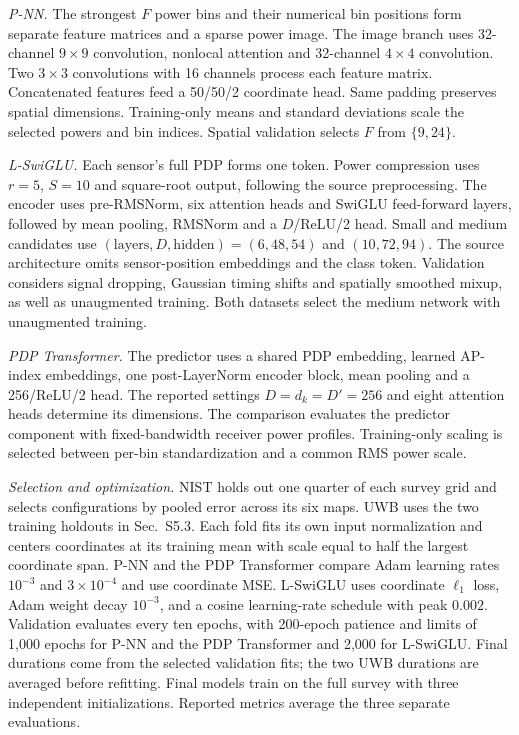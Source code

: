 \documentclass[10pt]{article}
\begin{document}
\emph{P-NN.} The strongest $F$ power bins and their numerical bin positions form separate feature matrices and a sparse power image. The image branch uses 32-channel $9\times9$ convolution, nonlocal attention and 32-channel $4\times4$ convolution. Two $3\times3$ convolutions with 16 channels process each feature matrix. Concatenated features feed a 50/50/2 coordinate head. Same padding preserves spatial dimensions. Training-only means and standard deviations scale the selected powers and bin indices. Spatial validation selects $F$ from $\{9,24\}$.

\emph{L-SwiGLU.} Each sensor's full PDP forms one token. Power compression uses $r=5$, $S=10$ and square-root output, following the source preprocessing. The encoder uses pre-RMSNorm, six attention heads and SwiGLU feed-forward layers, followed by mean pooling, RMSNorm and a $D$/ReLU/2 head. Small and medium candidates use $(\mathrm{layers},D,\mathrm{hidden})=(6,48,54)$ and $(10,72,94)$. The source architecture omits sensor-position embeddings and the class token. Validation considers signal dropping, Gaussian timing shifts and spatially smoothed mixup, as well as unaugmented training. Both datasets select the medium network with unaugmented training.

\emph{PDP Transformer.} The predictor uses a shared PDP embedding, learned AP-index embeddings, one post-LayerNorm encoder block, mean pooling and a 256/ReLU/2 head. The reported settings $D=d_k=D'=256$ and eight attention heads determine its dimensions. The comparison evaluates the predictor component with fixed-bandwidth receiver power profiles. Training-only scaling is selected between per-bin standardization and a common RMS power scale.

\emph{Selection and optimization.} NIST holds out one quarter of each survey grid and selects configurations by pooled error across its six maps. UWB uses the two training holdouts in Sec.~S5.3. Each fold fits its own input normalization and centers coordinates at its training mean with scale equal to half the largest coordinate span. P-NN and the PDP Transformer compare Adam learning rates $10^{-3}$ and $3\times10^{-4}$ and use coordinate MSE. L-SwiGLU uses coordinate $\ell_1$ loss, Adam weight decay $10^{-3}$, and a cosine learning-rate schedule with peak $0.002$. Validation evaluates every ten epochs, with 200-epoch patience and limits of 1,000 epochs for P-NN and the PDP Transformer and 2,000 for L-SwiGLU. Final durations come from the selected validation fits; the two UWB durations are averaged before refitting. Final models train on the full survey with three independent initializations. Reported metrics average the three separate evaluations.
\end{document}
